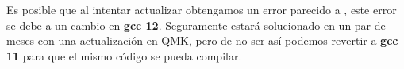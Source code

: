 \vspace*{0.5cm}

Es posible que al intentar actualizar obtengamos un error parecido a \newline
{}, este error se debe a un cambio en \textbf{gcc 12}. Seguramente estará solucionado en un par de meses con una actualización en QMK, pero de no ser así podemos revertir a \textbf{gcc 11} para que el mismo código se pueda compilar.